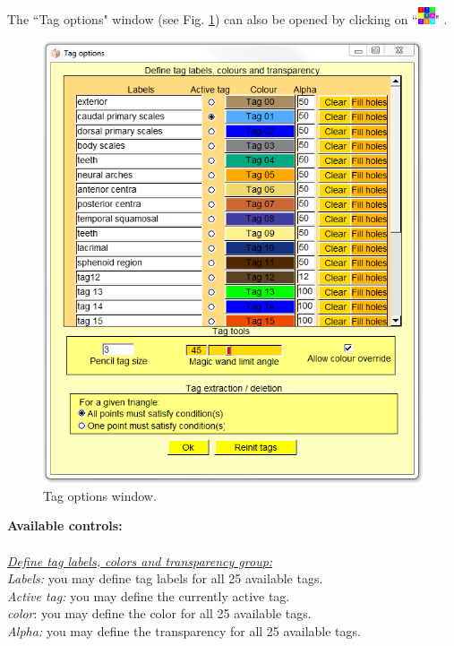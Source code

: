 The ``Tag options" window (see Fig. \ref{tag_options_window}) can also be opened by clicking on ``\includegraphics[scale=0.7]{images/pixmap/Show_Tag_Window2.png}" .
\begin{figure}
  \centering
  \includegraphics[scale=0.5]{images/Tags/Tags.png} 
	\caption{Tag options window.}
\label{tag_options_window}
 
\end{figure}
\noindent
\textbf{Available controls:}\\
\\
\noindent
\textit{\underline{Define tag labels, colors and transparency group:}}\\
\textit{Labels:} you may define tag labels for all 25 available tags.\\
\textit{Active tag:} you may define the currently active tag.\\
\textit{color}: you may define the color for all 25 available tags.\\
\textit{Alpha:} you may define the transparency for all 25 available tags.\\
